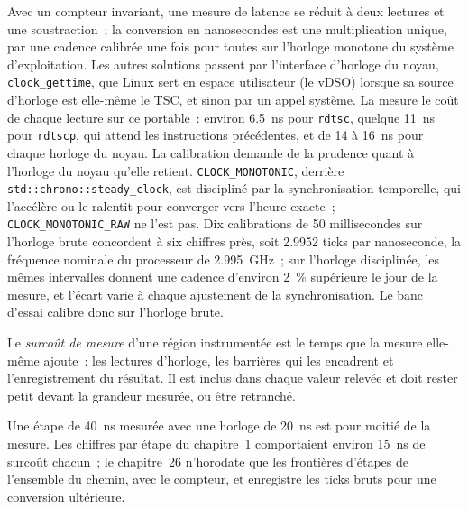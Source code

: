 Avec un compteur invariant, une mesure de latence se réduit à deux lectures et une soustraction~; la conversion en nanosecondes est
une multiplication unique, par une cadence calibrée une fois pour toutes sur l'horloge monotone du système d'exploitation. Les autres solutions passent par
l'interface d'horloge du noyau, \texttt{clock\_gettime}, que Linux sert en espace utilisateur (le vDSO) lorsque sa source d'horloge
est elle-même le TSC, et sinon par un appel système. La  mesure le coût de chaque lecture sur
ce portable~: environ \qty{6.5}{\nano\second} pour \texttt{rdtsc}, quelque \qty{11}{\nano\second} pour \texttt{rdtscp}, qui attend
les instructions précédentes, et de 14 à \qty{16}{\nano\second} pour chaque horloge du noyau. La calibration demande de la prudence quant à l'horloge du noyau qu'elle retient. \texttt{CLOCK\_MONOTONIC}, derrière \texttt{std::chrono::steady\_clock},
est discipliné par la synchronisation temporelle, qui l'accélère ou le ralentit pour converger vers l'heure exacte~;
\texttt{CLOCK\_MONOTONIC\_RAW} ne l'est pas. Dix calibrations de 50 millisecondes sur l'horloge brute concordent à six chiffres près,
soit 2.9952 ticks par nanoseconde, la fréquence nominale du processeur de 2.995~GHz~; sur l'horloge disciplinée, les mêmes intervalles donnent une
cadence d'environ 2~\% supérieure le jour de la mesure, et l'écart varie à chaque ajustement de la synchronisation. Le banc d'essai calibre
donc sur l'horloge brute.

\begin{definition}\label{def:ll:measuring-latency:overhead}
Le \emph{surcoût de mesure} d'une région instrumentée est le temps que la mesure elle-même
ajoute~: les lectures d'horloge, les barrières qui les encadrent et l'enregistrement du résultat. Il est inclus dans chaque valeur relevée et doit
rester petit devant la grandeur mesurée, ou être retranché.
\end{definition}

Une étape de \qty{40}{\nano\second} mesurée avec une horloge de \qty{20}{\nano\second} est pour moitié de la mesure. Les chiffres par étape du chapitre~1
comportaient environ \qty{15}{\nano\second} de surcoût chacun~; le chapitre~26 n'horodate que les frontières d'étapes de l'ensemble du chemin, avec le
compteur, et enregistre les ticks bruts pour une conversion ultérieure.

